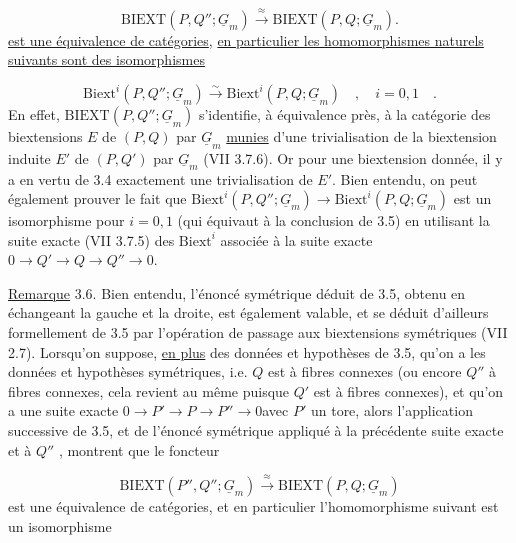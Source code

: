 \begin{equation}\tag{3.5.1}
\mathrm{BIEXT}(P,Q''; \underline{G}_m) \stackrel{\approx}{\longrightarrow} \mathrm{BIEXT}(P,Q;\underline{G}_m).
\end{equation}
\underline{est une équivalence de catégories}, \underline{en particulier les homomorphismes naturels suivants sont des isomorphismes}

\begin{equation}\tag{3.5.2}
\mathrm{Biext}^i(P,Q''; \underline{G}_m) \stackrel{\sim}{\longrightarrow} \mathrm{Biext}^i(P,Q; \underline{G}_m) \quad , \quad i = 0,1 \quad .
\end{equation}
En effet, $\mathrm{BIEXT}(P,Q'';\underline{G}_m)$ s'identifie, à équivalence près, à la catégorie des biextensions $E$ de $(P,Q)$ par $\underline{G}_m$ \underline{munies} d'une trivialisation de la biextension induite $E'$ de $(P,Q')$ par $\underline{G}_m$ (VII 3.7.6\quad ). Or pour une biextension donnée, il y a en vertu de 3.4 exactement une trivialisation de $E'$. Bien entendu, on peut également prouver le fait
que $\mathrm{Biext}^i(P,Q'';\underline{G}_m) \longrightarrow \mathrm{Biext}^i(P,Q;\underline{G}_m)$ est un isomorphisme pour $i = 0,1$ (qui équivaut à la conclusion de 3.5) en utilisant la suite exacte (VII 3.7.5\quad ) des $\mathrm{Biext}^i$ associée à la suite exacte $0 \to Q' \to Q \to Q'' \to 0$.

\underline{Remarque} 3.6. Bien entendu, l'énoncé symétrique déduit de 3.5, obtenu en échangeant la gauche et la droite, est également valable, et se déduit d'ailleurs formellement de 3.5 par l'opération de passage aux biextensions symétriques (VII 2.7\quad ). Lorsqu'on suppose, \underline{en plus} des données et hypothèses de 3.5, qu'on a les données et hypothèses symétriques, i.e. $Q$ est à fibres connexes (ou encore $Q''$ à fibres connexes, cela revient au même puisque $Q'$ est à fibres connexes), et qu'on a une suite exacte $0 \longrightarrow P' \longrightarrow P \longrightarrow P'' \longrightarrow 0$\quad avec $P'$ un tore, alors l'application successive de 3.5, et de l'énoncé symétrique appliqué à la précédente suite exacte et à $Q''$ , montrent que le foncteur

\begin{equation}\tag{3.6.1}
\mathrm{BIEXT}(P'',Q''; \underline{G}_m) \stackrel{\approx}{\longrightarrow} \mathrm{BIEXT}(P,Q;\underline{G}_m)
\end{equation}
est une équivalence de catégories, et en particulier l'homomorphisme suivant est un isomorphisme

